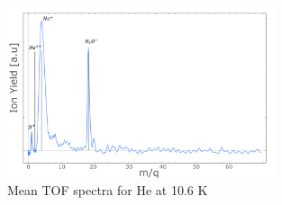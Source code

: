 \begin{figure}[hbtp]
\centering
\includegraphics[width=0.7\textwidth]{../Images/TOF-10k6.png}
\caption[MIR TOF spectra He ]{Mean TOF spectra for He at 10.6 K}
\label{fig:tofhe}
\end{figure}

